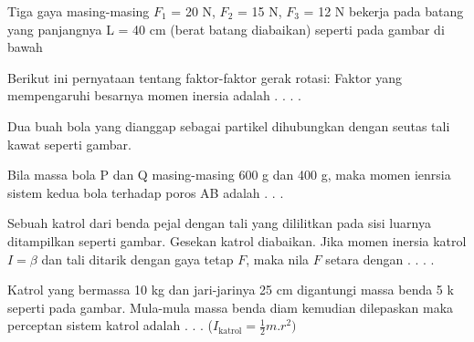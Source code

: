 

\item Tiga gaya masing-masing $F_1$ = 20 N, $F_2$ = 15 N, $F_3$ = 12 N bekerja pada batang yang panjangnya L = 40 cm (berat batang diabaikan) seperti pada gambar di bawah


\item Berikut ini pernyataan tentang faktor-faktor gerak rotasi:
Faktor yang mempengaruhi besarnya momen inersia adalah . . . .

\item Dua buah bola yang dianggap sebagai partikel dihubungkan dengan seutas tali kawat seperti gambar.

Bila massa bola P dan Q masing-masing 600 g dan 400 g, maka momen ienrsia sistem kedua bola terhadap poros AB adalah . . .


\item Sebuah katrol dari benda pejal dengan tali yang dililitkan pada sisi luarnya ditampilkan seperti gambar. Gesekan katrol diabaikan. Jika momen inersia katrol $I=\beta$ dan tali ditarik dengan gaya tetap $F$, maka nila $F$ setara dengan . . . .
\item Katrol yang bermassa 10 kg dan jari-jarinya 25 cm digantungi massa benda 5 k seperti pada gambar. Mula-mula massa benda diam kemudian dilepaskan maka perceptan sistem katrol adalah . . . ($I_{\text{katrol}} = \frac{1}{2} m.r^2)$

